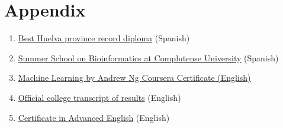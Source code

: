 \documentclass[paper=a4,fontsize=11pt]{article} %
\newcommand{\NewPart}[1]{\section*{
									{#1}}}
\begin{document}
\NewPart{Appendix}
\begin{enumerate}


\item \hyperlink{premio_extraordinario}{Best Huelva province record diploma} (Spanish)
\item \hyperlink{complu}{Summer School on Bioinformatics at Complutense University} (Spanish)

\item \hyperlink{ML-Coursera}{Machine Learning by Andrew Ng Coursera Certificate (English)}

\item \hyperlink{exp-en}{Official college transcript of results} (English)
\item \hyperlink{cae}{Certificate in Advanced English} (English)
\end{enumerate}
%



\end{document}
